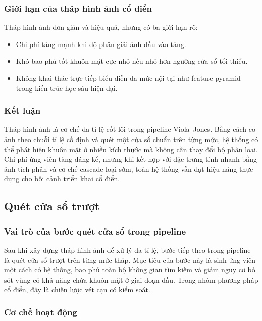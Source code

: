 \subsubsection{Giới hạn của tháp hình ảnh cổ điển}

Tháp hình ảnh đơn giản và hiệu quả, nhưng có ba giới hạn rõ:
\begin{itemize}
  \item Chi phí tăng mạnh khi độ phân giải ảnh đầu vào tăng.
  \item Khó bao phủ tốt khuôn mặt cực nhỏ nếu nhỏ hơn ngưỡng cửa sổ tối thiểu.
  \item Không khai thác trực tiếp biểu diễn đa mức nội tại như feature pyramid trong kiến trúc học sâu hiện đại.
\end{itemize}

\subsubsection{Kết luận}

Tháp hình ảnh là cơ chế đa tỉ lệ cốt lõi trong pipeline Viola--Jones.
Bằng cách co ảnh theo chuỗi tỉ lệ cố định và quét một cửa sổ chuẩn trên từng mức, hệ thống có thể phát hiện khuôn mặt ở nhiều kích thước mà không cần thay đổi bộ phân loại.
Chi phí ứng viên tăng đáng kể, nhưng khi kết hợp với đặc trưng tính nhanh bằng ảnh tích phân và cơ chế cascade loại sớm, toàn hệ thống vẫn đạt hiệu năng thực dụng cho bối cảnh triển khai cổ điển.  \cite{viola2001rapid,viola2004robust,li2012facechapter}

\subsection{Quét cửa sổ trượt}

\subsubsection{Vai trò của bước quét cửa sổ trong pipeline}

Sau khi xây dựng tháp hình ảnh để xử lý đa tỉ lệ, bước tiếp theo trong pipeline là quét cửa sổ trượt trên từng mức tháp.
Mục tiêu của bước này là sinh ứng viên một cách có hệ thống, bao phủ toàn bộ không gian tìm kiếm và giảm nguy cơ bỏ sót vùng có khả năng chứa khuôn mặt ở giai đoạn đầu.
Trong nhóm phương pháp cổ điển, đây là chiến lược vét cạn có kiểm soát.  \cite{viola2001rapid,li2012facechapter}

\subsubsection{Cơ chế hoạt động}

